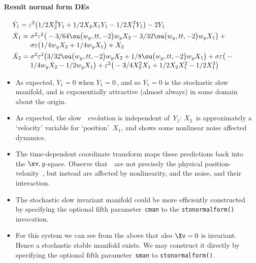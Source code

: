 \paragraph{Result normal form DEs}
\begin{align*}&
\dot Y_{1}=\eps^{2} \big(1/2 X_{2}^{2} Y_{1}+1/2 X_{2} X_{1} Y_{1}-1/2 X
_{1}^{2} Y_{1}\big)-2 Y_{1}
\\&
\dot X_{1}=\ParMath{\sigma ^{2} \eps^{2} \big(-3/64 \ou\big(w_{y},tt,-2\big) w_{y
} X_{2}-3/32 \ou\big(w_{y},tt,-2\big) w_{y} X_{1}\big)+\sigma  \eps 
\big(1/4 w_{y} X_{2}+1/4 w_{y} X_{1}\big)+X_{2}
}
\\&
\dot X_{2}=\ParMath{\sigma ^{2} \eps^{2} \big(3/32 \ou\big(w_{y},tt,-2\big) w_{y}
 X_{2}+1/8 \ou\big(w_{y},tt,-2\big) w_{y} X_{1}\big)+\sigma  \eps \big(-
1/4 w_{y} X_{2}-1/2 w_{y} X_{1}\big)+\eps^{2} \big(-3/4 X_{2}^{2} X_{1}+
1/2 X_{2} X_{1}^{2}-1/2 X_{1}^{3}\big)
}
\end{align*}
\begin{itemize}
\item As expected,  \(\dot Y_1=0\) when \(Y_1=0\)\,, and so \(Y_1=0\) is the stochastic slow manifold, and is exponentially attractive (almost always) in some domain about the origin.
\item As expected, the slow~\Xv\ evolution is independent of~\(Y_1\): \(X_2\)~is approximately a `velocity' variable for `position'~\(X_1\), and shows some nonlinear noise affected dynamics.
\item The time-dependent coordinate transform maps these predictions back into the \(\xv,y\)-space.  Observe that~\Xv\ are not precisely the physical position-veloxity~\xv, but instead are affected by nonlinearity, and the noise, and their interaction.
\item The stochastic slow invariant manifold could be more efficiently constructed by specifying the optional fifth parameter~\verb|cman| to the \verb|stonormalform()| invocation.
\item For this system we can see from the above that also \(\Xv=0\) is invariant.  Hence a stochastic stable manifold exists.  We may construct it directly by specifying the optional fifth parameter~\verb|sman| to \verb|stonormalform()|.
\end{itemize}


